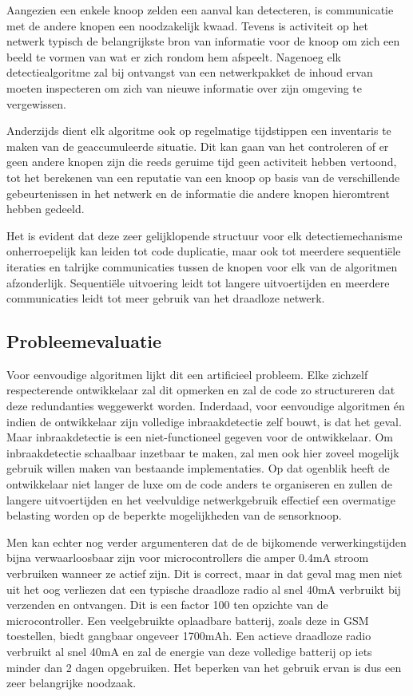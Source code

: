 \documentclass[12pt,a4paper]{article}
\begin{document}
Aangezien een enkele knoop zelden een aanval kan detecteren, is communicatie
met de andere knopen een noodzakelijk kwaad. Tevens is activiteit op het
netwerk typisch de belangrijkste bron van informatie voor de knoop om zich een
beeld te vormen van wat er zich rondom hem afspeelt. Nagenoeg elk
detectiealgoritme zal bij ontvangst van een netwerkpakket de inhoud ervan
moeten inspecteren om zich van nieuwe informatie over zijn omgeving te
vergewissen.

Anderzijds dient elk algoritme ook op regelmatige tijdstippen een inventaris te
maken van de geaccumuleerde situatie. Dit kan gaan van het controleren of er
geen andere knopen zijn die reeds geruime tijd geen activiteit hebben vertoond,
tot het berekenen van een reputatie van een knoop op basis van de verschillende
gebeurtenissen in het netwerk en de informatie die andere knopen hieromtrent
hebben gedeeld.

Het is evident dat deze zeer gelijklopende structuur voor elk
detectiemechanisme onherroepelijk kan leiden tot code duplicatie, maar ook tot
meerdere sequenti\"ele iteraties en talrijke communicaties tussen de knopen
voor elk van de algoritmen afzonderlijk. Sequenti\"ele uitvoering leidt tot
langere uitvoertijden en meerdere communicaties leidt tot meer gebruik van het
draadloze netwerk.

\subsection*{Probleemevaluatie}

Voor eenvoudige algoritmen lijkt dit een artificieel probleem. Elke zichzelf
respecterende ontwikkelaar zal dit opmerken en zal de code zo structureren dat
deze redundanties weggewerkt worden. Inderdaad, voor eenvoudige algoritmen \'en
indien de ontwikkelaar zijn volledige inbraakdetectie zelf bouwt, is dat het
geval. Maar inbraakdetectie is een niet-functioneel gegeven voor de
ontwikkelaar. Om inbraakdetectie schaalbaar inzetbaar te maken, zal men ook
hier zoveel mogelijk gebruik willen maken van bestaande implementaties. Op dat
ogenblik heeft de ontwikkelaar niet langer de luxe om de code anders te
organiseren en zullen de langere uitvoertijden en het veelvuldige
netwerkgebruik effectief een overmatige belasting worden op de beperkte
mogelijkheden van de sensorknoop.

Men kan echter nog verder argumenteren dat de de bijkomende verwerkingstijden
bijna verwaarloosbaar zijn voor microcontrollers die amper 0.4mA stroom
verbruiken wanneer ze actief zijn. Dit is correct, maar in dat geval mag men
niet uit het oog verliezen dat een typische draadloze radio al snel 40mA
verbruikt bij verzenden en ontvangen. Dit is een factor 100 ten opzichte van de
microcontroller. Een veelgebruikte oplaadbare batterij, zoals deze in GSM
toestellen, biedt gangbaar ongeveer 1700mAh. Een actieve draadloze radio
verbruikt al snel 40mA en zal de energie van deze volledige batterij op iets
minder dan 2 dagen opgebruiken. Het beperken van het gebruik ervan is dus een
zeer belangrijke noodzaak.
\end{document}
